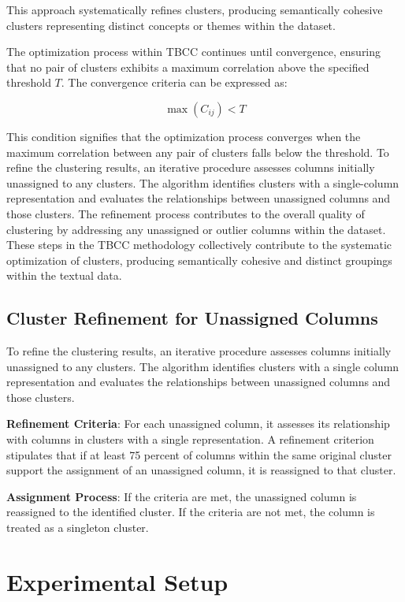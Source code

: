 \documentclass{article}
\begin{document}
This approach systematically refines clusters, producing semantically cohesive clusters representing distinct concepts or themes within the dataset.


The optimization process within TBCC continues until convergence, ensuring that no pair of clusters exhibits a maximum correlation above the specified threshold \( T \). The convergence criteria can be expressed as:

\[ \max(C_{ij}) < T \]

This condition signifies that the optimization process converges when the maximum correlation between any pair of clusters falls below the threshold.
To refine the clustering results, an iterative procedure assesses columns initially unassigned to any clusters. The algorithm identifies clusters with a single-column representation and evaluates the relationships between unassigned columns and those clusters. The refinement process contributes to the overall quality of clustering by addressing any unassigned or outlier columns within the dataset. These steps in the TBCC methodology collectively contribute to the systematic optimization of clusters, producing semantically cohesive and distinct groupings within the textual data.
\subsection{Cluster Refinement for Unassigned Columns}
To refine the clustering results, an iterative procedure assesses columns initially unassigned to any clusters. The algorithm identifies clusters with a single column representation and evaluates the relationships between unassigned columns and those clusters.

\textbf{Refinement Criteria}: For each unassigned column, it assesses its relationship with columns in clusters with a single representation. A refinement criterion stipulates that if at least 75 percent of columns within the same original cluster support the assignment of an unassigned column, it is reassigned to that cluster.

\textbf{Assignment Process}: If the criteria are met, the unassigned column is reassigned to the identified cluster. If the criteria are not met, the column is treated as a singleton cluster.


\section{Experimental Setup}
\end{document}

